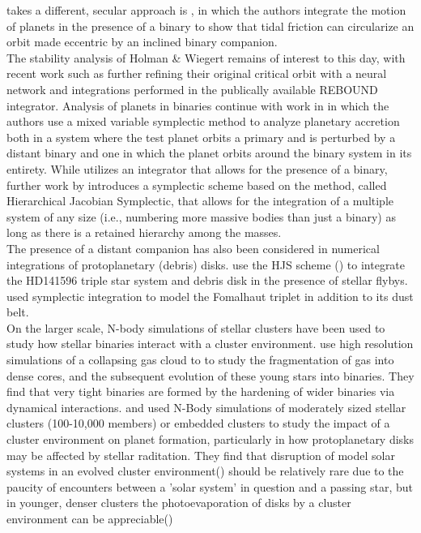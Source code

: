 \documentclass[manuscript]{aastex631}
\begin{document}
takes a different, secular approach is \cite{fab07}, in which the authors integrate the motion of planets in the presence of a binary to show that tidal friction can circularize an 
orbit made eccentric by an inclined binary companion.\\
The stability analysis of Holman \& Wiegert remains of interest to this day, with recent work such as \cite{lam18} further refining
their original critical orbit with a neural network and integrations performed in the publically available REBOUND integrator.
 Analysis of planets in binaries continue with work 
in \cite{cha02} in which the authors use a mixed variable symplectic method to analyze planetary accretion both in a system where the test planet orbits a primary and 
is perturbed by a distant binary and one in which the planet orbits around the binary system in its entirety. While \cite{cha02} utilizes an integrator that allows for the presence 
of a binary, further work by \cite{beu03} introduces a symplectic scheme based on the \cite{wis91} method, called Hierarchical Jacobian Symplectic, that allows for the 
integration of a multiple system of any size (i.e., numbering more massive bodies than just a binary) as long as there is a retained
hierarchy among the masses.  \\
The presence of a distant companion has also been considered in numerical integrations of protoplanetary (debris) disks. \cite{rec09} use the HJS scheme (\cite{beu03}) 
to integrate the HD141596 triple star system and debris disk in the presence of stellar flybys. 
\cite{beu14} used symplectic integration to model the Fomalhaut triplet in addition to its dust belt.  \\

\indent On the larger scale, N-body simulations of stellar clusters have been used to study how stellar binaries interact with a cluster environment. \cite{bat03} 
use high resolution simulations of a collapsing gas cloud to to study the fragmentation of gas into dense cores, 
and the subsequent evolution of these young stars into binaries. They find that very
 tight binaries are formed by the hardening of wider binaries via dynamical interactions. \cite{ada06} and \cite{pro09} used N-Body simulations of moderately sized stellar clusters
  (100-10,000 members) or embedded clusters to study the impact of a cluster environment on planet formation, particularly in how protoplanetary disks may be affected by stellar raditation.
  They find that disruption of model solar systems in an evolved cluster environment(\cite{ada06}) should be relatively rare due to the paucity of encounters between a 'solar system' 
  in question and a passing star, but in younger, denser clusters the photoevaporation of disks by a cluster environment can be appreciable(\cite{pro09})
  
\end{document}
